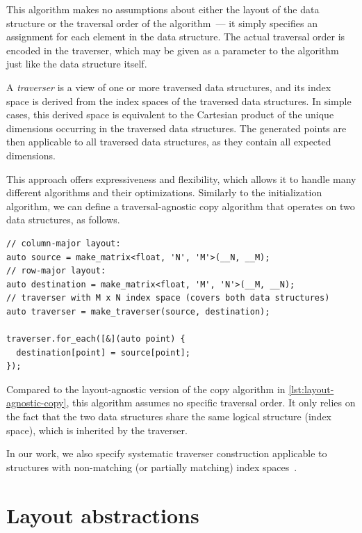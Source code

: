 This algorithm makes no assumptions about either the layout of the data structure or the traversal order of the algorithm~--- it simply specifies an assignment for each element in the data structure. The actual traversal order is encoded in the traverser, which may be given as a parameter to the algorithm just like the data structure itself.

A \emph{traverser} is a view of one or more traversed data structures, and its index space is derived from the index spaces of the traversed data structures. In simple cases, this derived space is equivalent to the Cartesian product of the unique dimensions occurring in the traversed data structures. The generated points are then applicable to all traversed data structures, as they contain all expected dimensions.

This approach offers expressiveness and flexibility, which allows it to handle many different algorithms and their optimizations. Similarly to the initialization algorithm, we can define a traversal-agnostic copy algorithm that operates on two data structures, as follows.

\begin{lstlisting}[style=C++, caption={A traversal-agnostic copy algorithm}, label={lst:traversal-agnostic-copy}]
// column-major layout:
auto source = make_matrix<float, 'N', 'M'>(__N, __M);
// row-major layout:
auto destination = make_matrix<float, 'M', 'N'>(__M, __N);
// traverser with M x N index space (covers both data structures)
auto traverser = make_traverser(source, destination);

traverser.for_each([&](auto point) {
  destination[point] = source[point];
});
\end{lstlisting}

Compared to the layout-agnostic version of the copy algorithm in \cref{lst:layout-agnostic-copy}, this algorithm assumes no specific traversal order. It only relies on the fact that the two data structures share the same logical structure (index space), which is inherited by the traverser.

In our work, we also specify systematic traverser construction applicable to structures with non-matching (or partially matching) index spaces~\cite{klepl2024pure}.


\section{Layout abstractions}\label{sec:astute-approach}

